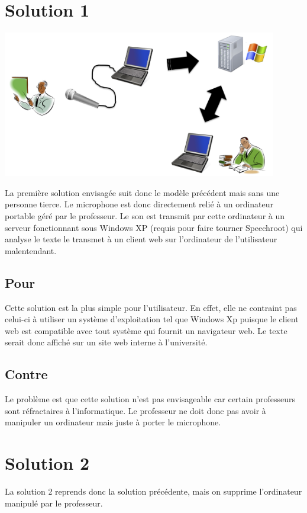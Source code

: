 \section{Solution 1}

\includegraphics[width=12cm]{img/solution1.png} 

La première solution envisagée suit donc le modèle précédent mais sans une personne tierce.
Le microphone est donc directement relié à un ordinateur portable géré par le professeur.
Le son est transmit par cette ordinateur à un serveur fonctionnant sous Windows XP (requis pour faire tourner Speechroot) qui analyse le texte le transmet à un client web sur l'ordinateur de l'utilisateur malentendant.

\subsection{Pour}
Cette solution est la plus simple pour l'utilisateur. En effet, elle ne contraint pas celui-ci à utiliser un système d'exploitation tel que Windows Xp puisque le client web est compatible avec tout système qui fournit un navigateur web. Le texte serait donc affiché sur un site web interne à l'université.

\subsection{Contre}
Le problème est que cette solution n'est pas envisageable car certain professeurs sont ré\-frac\-tai\-res à l'informatique. Le professeur ne doit donc pas avoir à manipuler un ordinateur mais juste à porter le microphone.


\section{Solution 2}

La solution 2 reprends donc la solution précédente, mais on supprime l'ordinateur manipulé par le professeur.

